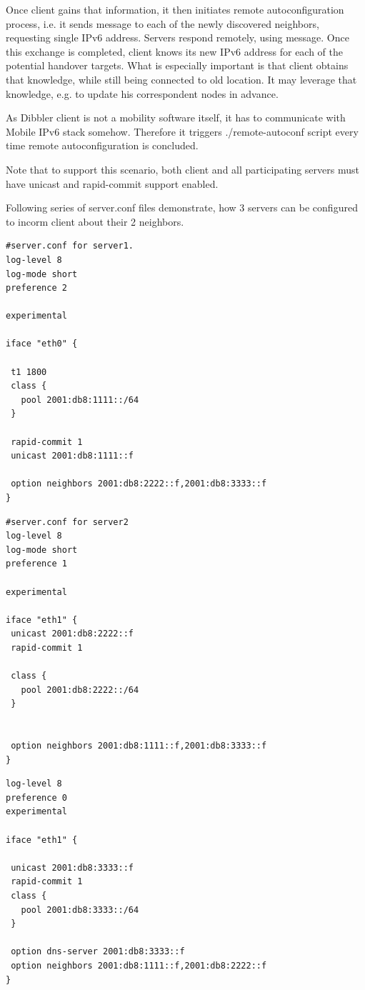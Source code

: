Once client gains that information, it then initiates remote
autoconfiguration process, i.e. it sends  message to each
of the newly discovered neighbors, requesting single IPv6
address. Servers respond remotely, using  message. Once
this exchange is completed, client knows its new IPv6 address for each
of the potential handover targets. What is especially important is
that client obtains that knowledge, while still being connected to old
location. It may leverage that knowledge, e.g. to update his
correspondent nodes in advance.

As Dibbler client is not a mobility software itself, it has to
communicate with Mobile IPv6 stack somehow. Therefore it triggers
./remote-autoconf script every time remote autoconfiguration is
concluded. 

Note that to support this scenario, both client and all participating
servers must have unicast and rapid-commit support enabled.

Following series of server.conf files demonstrate, how 3 servers can 
be configured to incorm client about their 2 neighbors.

\begin{lstlisting}
#server.conf for server1.
log-level 8
log-mode short
preference 2

experimental

iface "eth0" {

 t1 1800
 class {
   pool 2001:db8:1111::/64
 }

 rapid-commit 1
 unicast 2001:db8:1111::f

 option neighbors 2001:db8:2222::f,2001:db8:3333::f
}
\end{lstlisting}

\begin{lstlisting}
#server.conf for server2
log-level 8
log-mode short
preference 1

experimental

iface "eth1" {
 unicast 2001:db8:2222::f
 rapid-commit 1

 class {
   pool 2001:db8:2222::/64
 }


 option neighbors 2001:db8:1111::f,2001:db8:3333::f
}
\end{lstlisting}

\begin{lstlisting}
log-level 8
preference 0
experimental

iface "eth1" {

 unicast 2001:db8:3333::f
 rapid-commit 1
 class {
   pool 2001:db8:3333::/64
 }
 
 option dns-server 2001:db8:3333::f
 option neighbors 2001:db8:1111::f,2001:db8:2222::f
}
\end{lstlisting}

